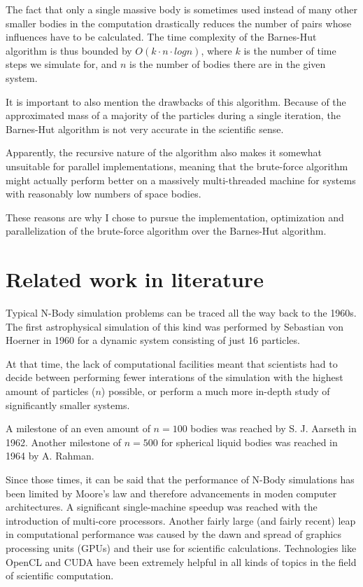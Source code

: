 \documentclass[journal]{IEEEtran}
\begin{document}
			The fact that only a single massive body is sometimes used instead of many other smaller bodies in the computation drastically reduces the number of pairs whose influences have to be calculated. The time complexity of the Barnes-Hut algorithm is thus bounded by $O(k \cdot n \cdot log n)$, where $k$ is the number of time steps we simulate for, and $n$ is the number of bodies there are in the given system.
			
			It is important to also mention the drawbacks of this algorithm. Because of the approximated mass of a majority of the particles during a single iteration, the Barnes-Hut algorithm is not very accurate in the scientific sense. 
			
			Apparently, the recursive nature of the algorithm also makes it somewhat unsuitable for parallel implementations, meaning that the brute-force algorithm might actually perform better on a massively multi-threaded machine for systems with reasonably low numbers of space bodies.
			
		These reasons are why I chose to pursue the implementation, optimization and parallelization of the brute-force algorithm over the Barnes-Hut algorithm.
	
	\section{Related work in literature}
	
		Typical N-Body simulation problems can be traced all the way back to the 1960s. The first astrophysical simulation of this kind was performed by Sebastian von Hoerner in 1960 for a dynamic system consisting of just 16 particles. \cite{camb_book}
		
		At that time, the lack of computational facilities meant that scientists had to decide between performing fewer interations of the simulation with the highest amount of particles ($n$)  possible, or perform a much more in-depth study of significantly smaller systems.\cite{camb_book}
		
		A milestone of an even amount of $n=100$ bodies was reached by S. J. Aarseth in 1962. Another milestone of $n=500$ for spherical liquid bodies was reached in 1964 by A. Rahman. \cite{history}
		
		Since those times, it can be said that the performance of N-Body simulations has been limited by Moore’s law and therefore advancements in moden computer architectures. A significant single-machine speedup was reached with the introduction of multi-core processors. Another fairly large (and fairly recent) leap in computational performance was caused by the dawn and spread of graphics processing units (GPUs) and their use for scientific calculations. Technologies like OpenCL and CUDA have been extremely helpful in all kinds of topics in the field of scientific computation.
		
\end{document}

